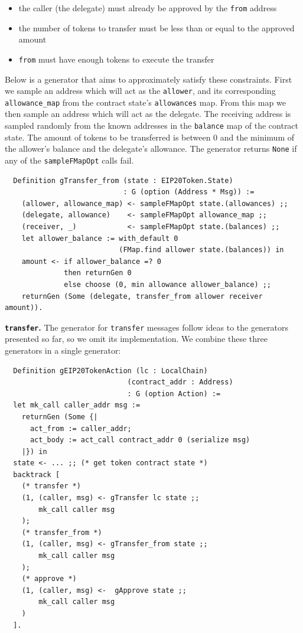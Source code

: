 \documentclass[twoside,11pt,openright]{report}
\newenvironment{code}{\captionsetup{type=figure, singlelinecheck=off, justification=raggedleft}}{}
\newcommand{\coq}[1]{\texttt{#1}}
\begin{document}
\begin{itemize}
    \item the caller (the delegate) must already be approved by the \coq{from} address
    \item the number of tokens to transfer must be less than or equal to the approved amount
    \item \coq{from} must have enough tokens to execute the transfer
\end{itemize}
Below is a generator that aims to approximately satisfy these constraints. First we sample an address which will act as the \coq{allower}, and its corresponding \coq{allowance\_map} from the contract state's \coq{allowances} map. From this map we then sample an address which will act as the delegate. The receiving address is sampled randomly from the known addresses in the \coq{balance} map of the contract state. The amount of tokens to be transferred is between $0$ and the minimum of the allower's balance and the delegate's allowance. The generator returns \coq{None} if any of the \coq{sampleFMapOpt} calls fail.
\begin{code}
\label{def:gTransferfrom}
\begin{verbatim}
  Definition gTransfer_from (state : EIP20Token.State) 
                            : G (option (Address * Msg)) :=
    (allower, allowance_map) <- sampleFMapOpt state.(allowances) ;;
    (delegate, allowance)    <- sampleFMapOpt allowance_map ;;
    (receiver, _)            <- sampleFMapOpt state.(balances) ;;
    let allower_balance := with_default 0 
                           (FMap.find allower state.(balances)) in
    amount <- if allower_balance =? 0 
              then returnGen 0 
              else choose (0, min allowance allower_balance) ;; 
    returnGen (Some (delegate, transfer_from allower receiver  amount)).
\end{verbatim}
\end{code}
\textbf{\coq{transfer}.} The generator for \coq{transfer} messages follow ideas to the generators presented so far, so we omit its implementation. We combine these three generators in a single generator: 
\begin{code}
\label{def:gEIP20TokenAction}
\begin{verbatim}
  Definition gEIP20TokenAction (lc : LocalChain) 
                             (contract_addr : Address) 
                             : G (option Action) := 
  let mk_call caller_addr msg :=
    returnGen (Some {|
      act_from := caller_addr;
      act_body := act_call contract_addr 0 (serialize msg) 
    |}) in 
  state <- ... ;; (* get token contract state *)
  backtrack [
    (* transfer *)
    (1, (caller, msg) <- gTransfer lc state ;;
        mk_call caller msg
    );
    (* transfer_from *)
    (1, (caller, msg) <- gTransfer_from state ;;
        mk_call caller msg
    );
    (* approve *)
    (1, (caller, msg) <-  gApprove state ;;
        mk_call caller msg
    )
  ].
\end{verbatim}
\end{code}
\end{document}
